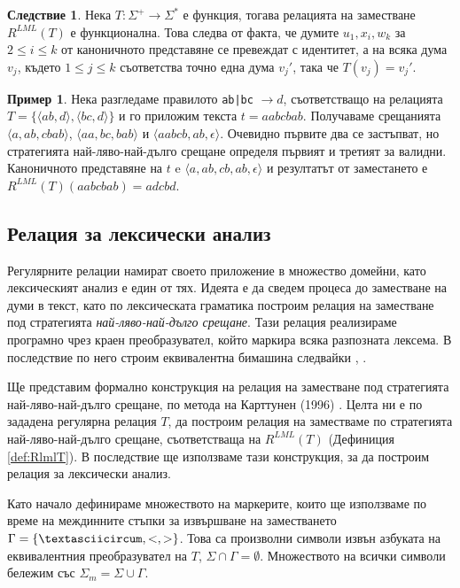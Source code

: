 \documentclass[12pt, oneside]{article}
\theoremstyle{definition}
\newtheorem{example}{Пример}[section]
\newtheorem{corollary}{Следствие}[section]
\begin{document}
\begin{corollary}
	Нека \( T: \Sigma^+ \to \Sigma^* \) е функция, тогава релацията на заместване \( R^{LML}(T) \) е функционална. Това следва от факта, че думите \(u_1, x_i, w_k \) за \( 2 \le i \le k \) от каноничното представяне се превеждат с идентитет, а на всяка дума \( v_j \), където \( 1 \le j \le k \) съответства точно една дума \( v_j' \), така че \( T(v_j) = v_j' \).
\end{corollary}

\begin{example}
	Нека разгледаме правилото \verb/ab|bc/ \( \to d \), съответстващо на релацията \(T = \{ \langle ab,d \rangle, \langle bc, d \rangle \} \) и го приложим текста \( t = aabcbab \). Получаваме срещанията \( \langle a, ab, cbab \rangle \), \( \langle aa, bc, bab \rangle \) и \( \langle aabcb, ab, \epsilon \rangle \). Очевидно първите два се застъпват, но стратегията най-ляво-най-дълго срещане определя първият и третият за валидни. Каноничното представяне на \(t \) e \( \langle a, ab, cb, ab, \epsilon  \rangle \) и резултатът от заместането е \( R^{LML}(T)(aabcbab) = adcbd \).
\end{example}

\subsection{Релация за лексически анализ}
\label{sec:LexARegRel}
Регулярните релации намират своето приложение в множество домейни, като лексическият анализ е един от тях. Идеята е да сведем процеса до заместване на думи в текст, като по лексическата граматика построим релация на заместване под стратегията \emph{най-ляво-най-дълго срещане}. Тази релация реализираме програмно чрез краен преобразувател, който маркира всяка разпозната лексема. В последствие по него строим еквивалентна бимашина следвайки \cite{GerdjikovEtAl:2017}, \cite{Mihov:2018-2}.

Ще представим формално конструкция на релация на заместване под стратегията най-ляво-най-дълго срещане, по метода на Карттунен (1996) \cite{Karttunen:96}. Целта ни е по зададена регулярна релация \(T\), да построим релация на заместваме по стратегията най-ляво-най-дълго срещане, съответстваща на \( R^{LML}(T) \) (Дефиниция \ref{def:RlmlT}). В последствие ще използваме тази конструкция, за да построим релация за лексически анализ.

Като начало дефинираме множеството на маркерите, които ще използваме по време на междинните стъпки за извършване на заместването \( \Gamma = \{ \textasciicircum, <, > \} \). Това са произволни символи извън азбуката на еквивалентния преобразувател на \(T\), \( \Sigma \cap \Gamma = \emptyset \). Множеството на всички символи бележим със \( \Sigma_m = \Sigma \cup \Gamma \).
\end{document}

